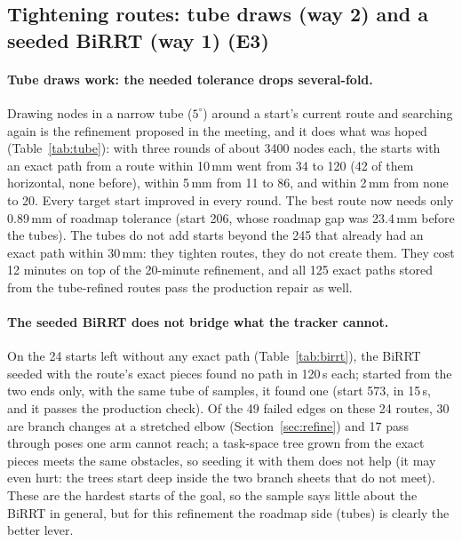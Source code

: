 \subsection{Tightening routes: tube draws (way 2) and a seeded BiRRT (way 1) (E3)}
\label{sec:e3}

\begin{table}[h]
\centering
\footnotesize
\caption{The 4000-node refinement without and with three rounds of tube draws
(each round: 200 draws around the routes of the 20 starts with the largest exact gap
above 10\,mm).}
\label{tab:tube}

\end{table}

\begin{table}[h]
\centering
\footnotesize
\caption{The seeded BiRRT on the 24 starts still without any exact path after the tube
rounds (smallest roadmap gaps first; all have roadmap gaps under 30\,mm).}
\label{tab:birrt}
\end{table}

\paragraph{Tube draws work: the needed tolerance drops several-fold.} Drawing nodes in a
narrow tube ($5^\circ$) around a start's current route and searching again is the
refinement proposed in the meeting, and it does what was hoped
(Table~\ref{tab:tube}): with three rounds of about 3400 nodes each, the starts with an
exact path from a route within 10\,mm went from 34 to 120 (42 of them horizontal, none
before), within 5\,mm from 11 to 86, and within 2\,mm from none to 20. Every target start
improved in every round. The best route now needs only 0.89\,mm of roadmap tolerance
(start 206, whose roadmap gap was 23.4\,mm before the tubes). The tubes do not add
starts beyond the 245 that already had an exact path within 30\,mm: they tighten
routes, they do not create them. They cost 12 minutes on top of the 20-minute
refinement, and all 125 exact paths stored from the tube-refined routes pass the
production repair as well.

\paragraph{The seeded BiRRT does not bridge what the tracker cannot.} On the 24 starts
left without any exact path (Table~\ref{tab:birrt}), the BiRRT seeded with the
route's exact pieces found no path in 120\,s each; started from the two ends only,
with the same tube of samples, it found one (start 573, in 15\,s, and it passes the
production check). Of the 49 failed edges on these 24 routes, 30 are branch changes at a
stretched elbow (Section~\ref{sec:refine}) and 17 pass through poses one arm cannot
reach; a task-space tree grown from the exact pieces meets the same obstacles, so
seeding it with them does not help (it may even hurt: the trees start deep inside the
two branch sheets that do not meet). These are
the hardest starts of the goal, so the sample says little about the BiRRT in general,
but for this refinement the roadmap side (tubes) is clearly the better lever.

